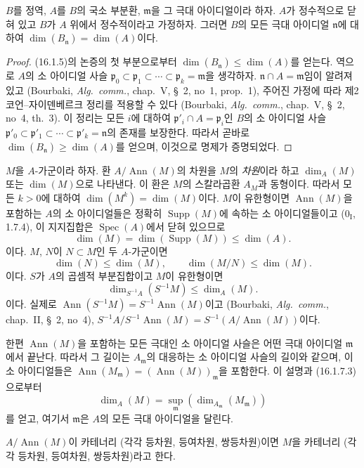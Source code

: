 \begin{proposition}[16.1.6]
\label{0.16.1.6-fr}
$B$를 정역, $A$를 $B$의 국소 부분환, $\mathfrak{m}$을 그 극대
아이디얼이라 하자. $A$가 정수적으로 닫혀 있고 $B$가 $A$ 위에서
정수적이라고 가정하자. 그러면 $B$의 모든 극대 아이디얼
$\mathfrak{n}$에 대하여
$\dim(B_{\mathfrak{n}})=\dim(A)$이다.
\end{proposition}

\begin{proof}
(16.1.5)의 논증의 첫 부분으로부터
$\dim(B_{\mathfrak{n}})\leq\dim(A)$를 얻는다. 역으로 $A$의 소
아이디얼 사슬
$\mathfrak{p}_0\subset\mathfrak{p}_1\subset\cdots\subset
\mathfrak{p}_k=\mathfrak{m}$을 생각하자.
$\mathfrak{n}\cap A=\mathfrak{m}$임이 알려져 있고 (Bourbaki,
\emph{Alg.~comm.}, chap.~V, \S~2, no~1, prop.~1), 주어진 가정에 따라
제2 코언--자이덴베르크 정리를 적용할 수 있다 (Bourbaki,
\emph{Alg.~comm.}, chap.~V, \S~2, no~4, th.~3). 이 정리는 모든
$i$에 대하여 $\mathfrak{p}'_i\cap A=\mathfrak{p}_i$인 $B$의 소
아이디얼 사슬
$\mathfrak{p}'_0\subset\mathfrak{p}'_1\subset\cdots\subset
\mathfrak{p}'_k=\mathfrak{n}$의 존재를 보장한다. 따라서 곧바로
$\dim(B_{\mathfrak{n}})\geq\dim(A)$를 얻으며, 이것으로 명제가
증명되었다.
\end{proof}

\begin{env}[16.1.7]
\label{0.16.1.7-fr}
$M$을 $A$-가군이라 하자. 환 $A/\operatorname{Ann}(M)$의 차원을
$M$의 \emph{차원}이라 하고 $\dim_A(M)$ 또는 $\dim(M)$으로
나타낸다. 이 환은 $M$의 스칼라곱환 $A_M$과 동형이다. 따라서 모든
$k>0$에 대하여 $\dim(M^k)=\dim(M)$이다. $M$이 유한형이면
$\operatorname{Ann}(M)$을 포함하는 $A$의 소 아이디얼들은 정확히
$\operatorname{Supp}(M)$에 속하는 소 아이디얼들이고
($0_{\mathrm I}$, 1.7.4), 이 지지집합은 $\operatorname{Spec}(A)$에서
닫혀 있으므로
\[
\label{0.16.1.7.1-fr}
  \dim(M)=\dim(\operatorname{Supp}(M))\leq\dim(A).
\tag{16.1.7.1}
\]
이다. $M$, $N$이 $N\subset M$인 두 $A$-가군이면
\[
\label{0.16.1.7.2-fr}
  \dim(N)\leq\dim(M),\qquad \dim(M/N)\leq\dim(M).
\tag{16.1.7.2}
\]
이다. $S$가 $A$의 곱셈적 부분집합이고 $M$이 유한형이면
\[
\label{0.16.1.7.3-fr}
  \dim_{S^{-1}A}(S^{-1}M)\leq\dim_A(M).
\tag{16.1.7.3}
\]
이다. 실제로
$\operatorname{Ann}(S^{-1}M)=S^{-1}\operatorname{Ann}(M)$이고
(Bourbaki, \emph{Alg.~comm.}, chap.~II, \S~2, no~4),
$S^{-1}A/S^{-1}\operatorname{Ann}(M)
=S^{-1}(A/\operatorname{Ann}(M))$이다.

한편 $\operatorname{Ann}(M)$을 포함하는 모든 극대인 소 아이디얼 사슬은
어떤 극대 아이디얼 $\mathfrak{m}$에서 끝난다. 따라서 그 길이는
$A_{\mathfrak{m}}$의 대응하는 소 아이디얼 사슬의 길이와 같으며, 이
소 아이디얼들은
$\operatorname{Ann}(M_{\mathfrak{m}})
=(\operatorname{Ann}(M))_{\mathfrak{m}}$을 포함한다. 이 설명과
(16.1.7.3)으로부터
\[
\label{0.16.1.7.4-fr}
  \dim_A(M)=\sup_{\mathfrak{m}}
  (\dim_{A_{\mathfrak{m}}}(M_{\mathfrak{m}}))
\tag{16.1.7.4}
\]
를 얻고, 여기서 $\mathfrak{m}$은 $A$의 모든 극대 아이디얼을 달린다.

$A/\operatorname{Ann}(M)$이 카테너리 (각각 등차원, 등여차원,
쌍등차원)이면 $M$을 카테너리 (각각 등차원, 등여차원, 쌍등차원)라고
한다.
\end{env}

